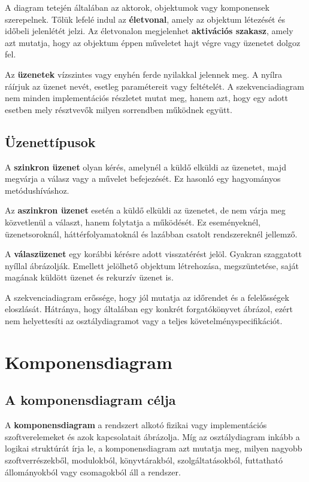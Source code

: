 A diagram tetején általában az aktorok, objektumok vagy komponensek szerepelnek. Tőlük lefelé indul az \textbf{életvonal}, amely az objektum létezését és időbeli jelenlétét jelzi. Az életvonalon megjelenhet \textbf{aktivációs szakasz}, amely azt mutatja, hogy az objektum éppen műveletet hajt végre vagy üzenetet dolgoz fel.

Az \textbf{üzenetek} vízszintes vagy enyhén ferde nyilakkal jelennek meg. A nyílra ráírjuk az üzenet nevét, esetleg paramétereit vagy feltételét. A szekvenciadiagram nem minden implementációs részletet mutat meg, hanem azt, hogy egy adott esetben mely résztvevők milyen sorrendben működnek együtt.

\subsection{Üzenettípusok}

A \textbf{szinkron üzenet} olyan kérés, amelynél a küldő elküldi az üzenetet, majd megvárja a válasz vagy a művelet befejezését. Ez hasonló egy hagyományos metódushíváshoz.

Az \textbf{aszinkron üzenet} esetén a küldő elküldi az üzenetet, de nem várja meg közvetlenül a választ, hanem folytatja a működését. Ez eseményeknél, üzenetsoroknál, háttérfolyamatoknál és lazábban csatolt rendszereknél jellemző.

A \textbf{válaszüzenet} egy korábbi kérésre adott visszatérést jelöl. Gyakran szaggatott nyíllal ábrázolják. Emellett jelölhető objektum létrehozása, megszüntetése, saját magának küldött üzenet és rekurzív üzenet is.

A szekvenciadiagram erőssége, hogy jól mutatja az időrendet és a felelősségek eloszlását. Hátránya, hogy általában egy konkrét forgatókönyvet ábrázol, ezért nem helyettesíti az osztálydiagramot vagy a teljes követelményspecifikációt.

\section{Komponensdiagram}

\subsection{A komponensdiagram célja}

A \textbf{komponensdiagram} a rendszert alkotó fizikai vagy implementációs szoftverelemeket és azok kapcsolatait ábrázolja. Míg az osztálydiagram inkább a logikai struktúrát írja le, a komponensdiagram azt mutatja meg, milyen nagyobb szoftverrészekből, modulokból, könyvtárakból, szolgáltatásokból, futtatható állományokból vagy csomagokból áll a rendszer.

